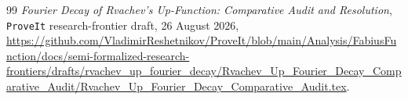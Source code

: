 \documentclass[11pt,oneside]{article}
\theoremstyle{definition}
\theoremstyle{remark}
\begin{document}
\begin{thebibliography}{99}
\emph{Fourier Decay of Rvachev's Up-Function: Comparative Audit and Resolution},
\newblock \texttt{ProveIt} research-frontier draft, 26 August 2026,
\newblock \url{https://github.com/VladimirReshetnikov/ProveIt/blob/main/Analysis/FabiusFunction/docs/semi-formalized-research-frontiers/drafts/rvachev_up_fourier_decay/Rvachev_Up_Fourier_Decay_Comparative_Audit/Rvachev_Up_Fourier_Decay_Comparative_Audit.tex}.

\end{thebibliography}
\end{document}

